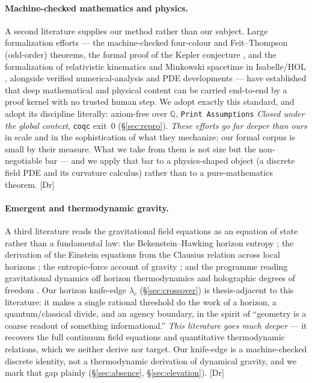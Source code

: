 \documentclass[10pt,twocolumn]{article}
\theoremstyle{definition}
\newcommand{\Dr}{\textsf{[Dr]}}
\newcommand{\code}[1]{\texttt{#1}}
\begin{document}
\paragraph{Machine-checked mathematics and physics.} A second literature supplies our
method rather than our subject. Large formalization efforts --- the machine-checked
four-colour \cite{gonthier2008} and Feit--Thompson (odd-order) \cite{feitthompson2013}
theorems, the formal proof of the Kepler conjecture \cite{hales2017}, and the formalization
of relativistic kinematics and Minkowski spacetime \cite{minkowski1909} in
Isabelle/HOL \cite{stannett2014,schutzformal2022}, alongside verified numerical-analysis and
PDE developments \cite{boldo2013} --- have
established that deep mathematical and physical content can be carried end-to-end by a
proof kernel with no trusted human step. We adopt exactly this standard, and adopt its
discipline literally: axiom-free over $\mathbb{Q}$, \code{Print Assumptions} \emph{Closed
under the global context}, \code{coqc} exit~0 (\S\ref{sec:repro}). \emph{These efforts go
far deeper than ours} in scale and in the sophistication of what they mechanize; our
formal corpus is small by their measure. What we take from them is not size but the
non-negotiable bar --- and we apply that bar to a physics-shaped object (a discrete field
PDE and its curvature calculus) rather than to a pure-mathematics theorem. \Dr{}

\paragraph{Emergent and thermodynamic gravity.} A third literature reads the gravitational
field equations \cite{einstein1915} as an equation of state rather than a fundamental law:
the Bekenstein--Hawking horizon entropy \cite{bekenstein1973,hawking1975}; the derivation of
the Einstein equations from the Clausius relation \cite{clausius1865} across local horizons
\cite{jacobson1995}; the entropic-force account of gravity \cite{verlinde2011}; and the
programme reading gravitational dynamics off horizon thermodynamics and holographic
degrees of freedom \cite{padmanabhan2010}. Our horizon knife-edge $\lambda_c$ (\S\ref{sec:crossover}) is
thesis-adjacent to this literature: it makes a single rational threshold do the work of a
horizon, a quantum/classical divide, and an agency boundary, in the spirit of ``geometry
is a coarse readout of something informational.'' \emph{This literature goes much deeper}
--- it recovers the full continuum field equations and quantitative thermodynamic
relations, which we neither derive nor target. Our knife-edge is a machine-checked
discrete identity, not a thermodynamic derivation of dynamical gravity, and we mark that
gap plainly (\S\ref{sec:absence}, \S\ref{sec:elevation}). \Dr{}
\end{document}
